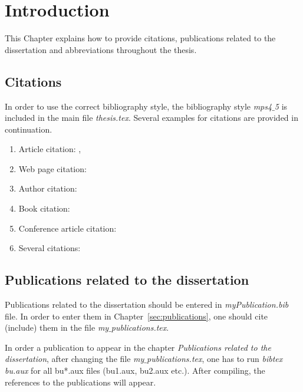 \chapter{Introduction}

This Chapter explains how to provide citations, publications related to the dissertation and abbreviations throughout the thesis. 

\section{Citations}
In order to use the correct bibliography style, the bibliography style \textit{mps4$\_$5} is included in the main file \textit{thesis.tex}. Several examples for citations are provided in continuation.

\begin{enumerate}
	\item Article citation: \citep{Saaty2003a}, \citep{Saaty2003}
	\item Web page citation: \citep{TheEconomist2010}
	\item Author citation: \cite{Zopounidis2006}
	\item Book citation: \citep{BohanecDEXi2011}
	\item Conference article citation: \citep{Baracskai2003}
	\item Several citations: 
	\subitem \citep{BohanecDEXi2011, Burstein2008, Power2002}
	\subitem  \citep{Skinner1999, Ronald} 
	\subitem   \citep{Triantaphyllou, French, Bouyssou2006}
	\subitem \citep{Figueira2005}
	\subitem \citep{Jacquet-Lagreze1982} 
	\subitem \citep{Saaty2008}
	\subitem \citep{Moshkovich1995}
	\subitem \citep{GrecoRSMCDA}
	\subitem \citep{Adam2008, Figueira2005, Bouyssou2006}
	\subitem \citep{Menzies2006, Saaty2008, Zadeh1975, Guo2009, Barron1996} 
\end{enumerate}

\section{Publications related to the dissertation}
Publications related to the dissertation should be entered in  \textit{myPublication.bib} file. In order to enter them in Chapter~\ref{sec:publications}, one should cite (include) them in the file \textit{my$\_$publications.tex}.

In order a publication to appear in the chapter \emph{Publications related to the dissertation}, after changing the file \textit{my$\_$publications.tex}, one has to run \textit{bibtex bu.aux} for all bu*.aux files (bu1.aux, bu2.aux etc.). After compiling, the references to the publications will appear.


